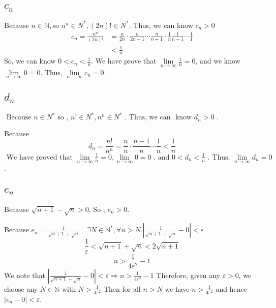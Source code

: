 \documentclass[11pt,twoside,a4paper]{article}
\begin{document}
\subsection{$c_{n}$}
Because $n\in \mathbb{N},  $so $n^{n} \in N^{*} ,(2 n) ! \in N^{*} $. Thus, we can know $c_{n}>0$
\begin{align*}
c_{n}=\frac{n^{n}}{(2 n) !} &=\frac{n}{2 n} \cdot \frac{n}{2 n-1} \cdots \frac{n}{n+1} \cdot \frac{1}{n} \frac{1}{n-1} \cdots \frac{1}{1} \\
&<\frac{1}{n}
\end{align*}
So, we can know $\displaystyle0<c_{n}<\frac{1}{n}$. We have prove that $\displaystyle \lim\limits_{n\to\infty} \frac{1}{n}=0$, and we know $\lim\limits_{n\to\infty}0=0$. Thus, $\lim\limits_{n\to\infty}c_{n}=0$.

\subsection{$d_{n}$}
$\displaystyle
\text { Because } n \in N^{*} \text { so , } n ! \in N^{*}, n^{n} \in N^{*} \text { . Thus, we can } 
\text { know } d_{n}>0 \text { . } $\par
Because $$ d_{n}=\frac{n !}{n^{n}}=\frac{n}{n} \cdot \frac{n-1}{n} \cdots \frac{1}{n}<\frac{1}{n} $$
$\text { We have proved that } \lim \limits_{n\to\infty}\frac{1}{n}=0, \lim\limits_{n\to\infty} 0=0 \text { . and } 
0<d_{n}<\frac{1}{n} \text { . Thus, } \lim \limits_{n\to\infty} d_{n}=0$.

\subsection{$e_{n}$}
Because $ \sqrt{n+1}-\sqrt{n}>0 $. So ,  $e_{n}>0 $.
\par\noindent
Because $\displaystyle e_{n}=\frac{1}{\sqrt{n+1}+\sqrt{n}}\quad
 \exists N \in \mathbb{N}^{*}, \forall n>N .\left|\frac{1}{\sqrt{n+1}+\sqrt{n}}-0\right|<\varepsilon $ 
$$\displaystyle\frac{1}{\varepsilon}<\sqrt{n+1}+\sqrt{n}<2 \sqrt{n+1} $$
$$n>\frac{1}{4 \varepsilon^{2}}-1$$
We note that $\displaystyle \left|\frac{1}{\sqrt{n+1}+\sqrt{n}}-0\right|<\varepsilon\Rightarrow n>\frac{1}{4 \varepsilon^{2}}-1$ Therefore, given any $\varepsilon>0$, we choose any $N\in \mathbb{N}$ with $\displaystyle N>\frac{1}{4 \varepsilon^{2}}$ Then for all $n > N$ we have $ n >\displaystyle\frac{1}{4 \varepsilon^{2}}$ and hence
$\displaystyle \left|e_{n}-0\right|<\varepsilon$. 

\end{document}

